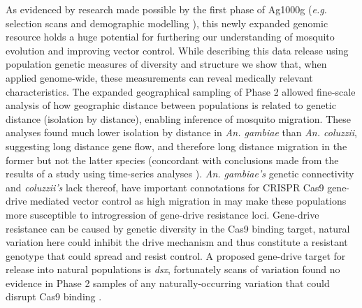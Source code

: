 \documentclass[a4paper,11pt,abstracton,hidelinks]{scrartcl}
\begin{document}
As evidenced by research made possible by the first phase of Ag1000g \cite{Ag1000gConsortium2017} (\textit{e.g.} selection scans \cite{xue2019} and demographic modelling \cite{khatri2018}), this newly expanded genomic resource holds a huge potential for furthering our understanding of mosquito evolution and improving vector control.
%
While describing this data release using population genetic measures of diversity and structure we show that, when applied genome-wide, these measurements can reveal medically relevant characteristics.
%
The expanded geographical sampling of Phase 2 allowed fine-scale analysis of how geographic distance between populations is related to genetic distance (isolation by distance), enabling inference of mosquito migration.
%
These analyses found much lower isolation by distance in \textit{An. gambiae} than \textit{An. coluzzii}, suggesting long distance gene flow, and therefore long distance migration in the former but not the latter species (concordant with conclusions made from the results of a study using time-series analyses \cite{dao2014}).
%
\textit{An. gambiae’s} genetic connectivity and \textit{coluzzii's} lack thereof, have important connotations for CRISPR Cas9 gene-drive mediated vector control as high migration in  may make these populations more susceptible to introgression of gene-drive resistance loci.
%
Gene-drive resistance can be caused by genetic diversity in the Cas9 binding target, natural variation here could inhibit the drive mechanism and thus constitute a resistant genotype that could spread and resist control.
%
A proposed gene-drive target for release into natural populations is \textit{dsx}, fortunately scans of variation found no evidence in Phase 2 samples of any naturally-occurring variation that could disrupt Cas9 binding \cite{kyrou2018}. 
\end{document}
